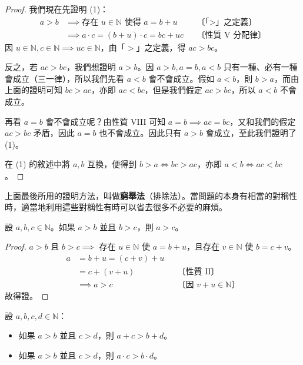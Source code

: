 \begin{proof}
我們現在先證明 (1)：
\begin{align*}
  a > b &\implies \text{存在 } u \in \mathbb{N} \text{ 使得 } a = b + u && \text{〔「$>$」之定義〕} \\
  &\implies a \cdot c = (b + u) \cdot c = bc + uc && \text{〔性質 V 分配律〕}
\end{align*}
因 $u \in \mathbb{N}, c \in \mathbb{N} \implies uc \in \mathbb{N}$，由「$>$」之定義，得 $ac > bc$。

反之，若 $ac > bc$，我們想證明 $a > b$。因 $a > b, a = b, a < b$ 只有一種、必有一種會成立（三一律），所以我們先看 $a < b$ 會不會成立。假如 $a < b$，則 $b > a$，而由上面的證明可知 $bc > ac$，亦即 $ac < bc$，但是我們假定 $ac > bc$，所以 $a < b$ 不會成立。

再看 $a = b$ 會不會成立呢？由性質 VIII 可知 $a = b \implies ac = bc$，又和我們的假定 $ac > bc$ 矛盾，因此 $a = b$ 也不會成立。因此只有 $a > b$ 會成立，至此我們證明了 (1)。

在 (1) 的敘述中將 $a, b$ 互換，便得到 $b > a \iff bc > ac$，亦即 $a < b \iff ac < bc$。
\end{proof}

\begin{remark}
上面最後所用的證明方法，叫做\textbf{窮舉法}（排除法）。當問題的本身有相當的對稱性時，適當地利用這些對稱性有時可以省去很多不必要的麻煩。
\end{remark}

\begin{prop}[次序遞移律 X]\label{prop:nat_x}
設 $a, b, c \in \mathbb{N}$。如果 $a > b$ 並且 $b > c$，則 $a > c$。
\end{prop}

\begin{proof}
$a > b$ 且 $b > c \implies$ 存在 $u \in \mathbb{N}$ 使 $a = b+u$，且存在 $v \in \mathbb{N}$ 使 $b = c+v$。
\begin{align*}
  a &= b + u = (c + v) + u \\
  &= c + (v + u) && \text{〔性質 II〕} \\
  &\implies a > c && \text{〔因 $v+u \in \mathbb{N}$〕}
\end{align*}
故得證。
\end{proof}

\begin{prop}[同向不等式相加與相乘]\label{prop:nat_ineq_add_mul}
設 $a, b, c, d \in \mathbb{N}$：
\begin{itemize}
  \item[\textup{(XI')}] 如果 $a > b$ 並且 $c > d$，則 $a+c > b+d$。
  \item[\textup{(XII')}] 如果 $a > b$ 並且 $c > d$，則 $a \cdot c > b \cdot d$。
\end{itemize}
\end{prop}

